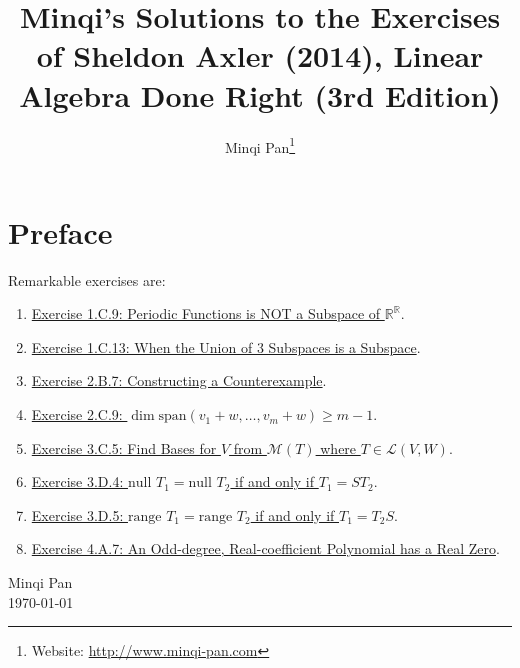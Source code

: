 \documentclass{amsbook}
\theoremstyle{definition}
\theoremstyle{remark}
\numberwithin{section}{chapter}
\numberwithin{equation}{chapter}
\begin{document}
\frontmatter

\title{Minqi's Solutions to the Exercises of Sheldon Axler (2014), Linear Algebra Done Right (3rd Edition)}

\author{Minqi Pan\footnote{Website: \href{http://www.minqi-pan.com}{http://www.minqi-pan.com}}}

\maketitle

\setcounter{page}{4}

\tableofcontents

\chapter*{Preface}

Remarkable exercises are:
\begin{enumerate}
\item\hyperref[Exercise 1.C.9]{Exercise 1.C.9: Periodic Functions is NOT a Subspace of $\mathbb{R}^\mathbb{R}$}.
\item\hyperref[Exercise 1.C.13]{Exercise 1.C.13: When the Union of 3 Subspaces is a Subspace}.
\item\hyperref[Exercise 2.B.7]{Exercise 2.B.7: Constructing a Counterexample}.
\item\hyperref[Exercise 2.C.9]{Exercise 2.C.9: $\dim\text{span}(v_1+w,\dots,v_m+w)\geqslant m-1$}.
\item\hyperref[Exercise 3.C.5]{Exercise 3.C.5: Find Bases for $V$ from $\mathcal{M}(T)$ where $T\in\mathcal{L}(V,W)$}.
\item\hyperref[Exercise 3.D.4]{Exercise 3.D.4: $\text{null }T_1=\text{null }T_2$ if and only if $T_1=ST_2$}.
\item\hyperref[Exercise 3.D.5]{Exercise 3.D.5: $\text{range }T_1=\text{range }T_2$ if and only if $T_1=T_2S$}.
\item\hyperref[Exercise 4.A.7]{Exercise 4.A.7: An Odd-degree, Real-coefficient Polynomial has a Real Zero}.
\end{enumerate}

\medskip
\begin{flushright}
Minqi Pan\\
\today
\end{flushright}

\mainmatter





\backmatter


\end{document}
